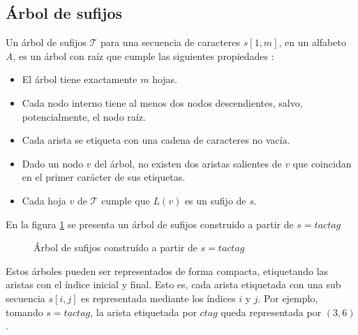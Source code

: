 \subsection{Árbol de sufijos}
\label{sec:defSufixTree}
Un árbol de sufijos $\mathcal{T}$ para una secuencia de caracteres $s[1,m]$, en un alfabeto {\it A}, es un árbol con raíz que cumple las siguientes propiedades \cite{GUS}:
\begin{itemize}
\item El árbol tiene exactamente $m$ hojas.
\item Cada nodo interno tiene al menos dos nodos descendientes, salvo, potencialmente, el nodo raíz.
\item Cada arista se etiqueta con una cadena de caracteres no vacía.
\item Dado un nodo $v$ del árbol, no existen dos aristas salientes de $v$ que coincidan en el primer carácter de sus etiquetas.
\item Cada hoja $v$ de $\mathcal{T}$ cumple que $L(v)$ es un sufijo de $s$.
\end{itemize}
\begin{example*}
En la figura \ref{fig:sufixTree1} se presenta un árbol de sufijos construido a partir de $s=tactag$
\begin{figure}[H]
\centering
{}
\caption[Ejemplo: Árbol de sufijos]{Árbol de sufijos construído a partir de $s=tactag$}
	\label{fig:sufixTree1}
\end{figure}
\end{example*}
\myrule{}{}
Estos árboles pueden ser representados de forma compacta, etiquetando las aristas con el índice inicial y final. Esto es, cada arista etiquetada con una sub secuencia $s[i,j]$ es representada mediante los índices $i$ y $j$. Por ejemplo, tomando $s=tactag$, la arista etiquetada por $ctag$ queda representada por $(3,6)$.\\

